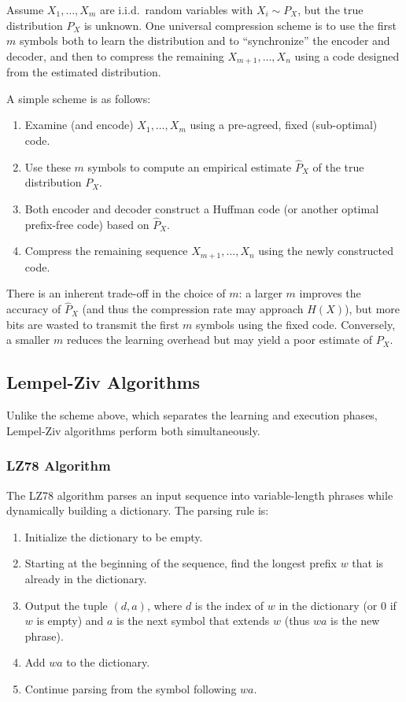 Assume \(X_1, \dots, X_m\) are i.i.d.\ random variables with \(X_i \sim P_X\), but the true distribution \(P_X\) is unknown. One universal compression scheme is to use the first \(m\) symbols both to learn the distribution and to “synchronize” the encoder and decoder, and then to compress the remaining \(X_{m+1},\dots,X_n\) using a code designed from the estimated distribution.

A simple scheme is as follows:
\begin{enumerate}
    \item Examine (and encode) \(X_1,\dots,X_m\) using a pre-agreed, fixed (sub-optimal) code.
    \item Use these \(m\) symbols to compute an empirical estimate \(\hat{P}_X\) of the true distribution \(P_X\).
    \item Both encoder and decoder construct a Huffman code (or another optimal prefix-free code) based on \(\hat{P}_X\).
    \item Compress the remaining sequence \(X_{m+1},\dots,X_n\) using the newly constructed code.
\end{enumerate}

There is an inherent trade-off in the choice of \(m\): a larger \(m\) improves the accuracy of \(\hat{P}_X\) (and thus the compression rate may approach \(H(X)\)), but more bits are wasted to transmit the first \(m\) symbols using the fixed code. Conversely, a smaller \(m\) reduces the learning overhead but may yield a poor estimate of \(P_X\).

\subsection{Lempel-Ziv Algorithms}
\label{sec:lz}
Unlike the scheme above, which separates the learning and execution phases, Lempel-Ziv algorithms perform both simultaneously.

\subsubsection*{LZ78 Algorithm}
The LZ78 algorithm parses an input sequence into variable-length phrases while dynamically building a dictionary. The parsing rule is:
\begin{enumerate}
    \item Initialize the dictionary to be empty.
    \item Starting at the beginning of the sequence, find the longest prefix \(w\) that is already in the dictionary.
    \item Output the tuple \((d, a)\), where \(d\) is the index of \(w\) in the dictionary (or 0 if \(w\) is empty) and \(a\) is the next symbol that extends \(w\) (thus \(w a\) is the new phrase).
    \item Add \(w a\) to the dictionary.
    \item Continue parsing from the symbol following \(w a\).
\end{enumerate}

